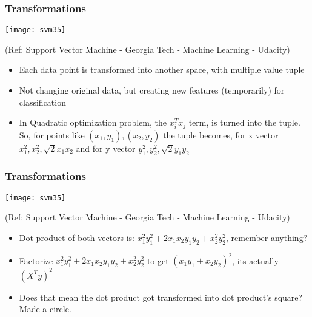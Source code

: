 \begin{frame}[fragile] \frametitle{Transformations}
\begin{center}
\texttt{[image: svm35]}

\tiny{(Ref: Support Vector Machine - Georgia Tech - Machine Learning - Udacity)}
\end{center}

\begin{itemize}
\item Each data point is transformed into another space, with multiple value tuple
\item Not changing original data, but creating new features (temporarily) for classification
\item In Quadratic optimization problem, the $x_i^Tx_j$ term, is turned into the tuple. So, for points
like $(x_1,y_1), (x_2,y_2)$ the tuple becomes, for x vector $x_1^2,x_2^2,\sqrt{2}x_1x_2$ and for y vector $y_1^2,y_2^2,\sqrt{2}y_1y_2$
\end{itemize}
\end{frame}

\begin{frame}[fragile] \frametitle{Transformations}
\begin{center}
\texttt{[image: svm35]}

\tiny{(Ref: Support Vector Machine - Georgia Tech - Machine Learning - Udacity)}
\end{center}

\begin{itemize}
\item Dot product of both vectors is: $x_1^2y_1^2+2x_1x_2y_1y_2+x_2^2y_2^2$, remember anything?
\item Factorize $x_1^2y_1^2+2x_1x_2y_1y_2+x_2^2y_2^2$ to get $(x_1y_1+x_2y_2)^2$, its actually $(X^Ty)^2$
\item Does that mean the dot product got transformed into dot product's square? Made a circle.
\end{itemize}
\end{frame}


